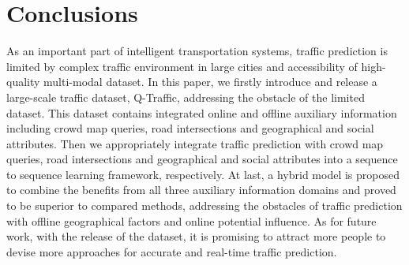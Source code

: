 \section{Conclusions}
\label{conclusions}
As an important part of intelligent transportation systems, traffic prediction is limited by complex traffic environment in large cities and accessibility of high-quality multi-modal dataset. In this paper, we firstly introduce and release a large-scale traffic dataset, Q-Traffic, addressing the obstacle of the limited dataset. This dataset contains integrated online and offline auxiliary information including crowd map queries, road intersections and geographical and social attributes. Then we appropriately integrate traffic prediction with crowd map queries, road intersections and geographical and social attributes into a sequence to sequence learning framework, respectively. At last, a hybrid model is proposed to combine the benefits from all three auxiliary information domains and proved to be superior to compared methods, addressing the obstacles of traffic prediction with offline geographical factors and online potential influence. As for future work, with the release of the dataset, it is promising to attract more people to devise more approaches for accurate and real-time traffic prediction.
